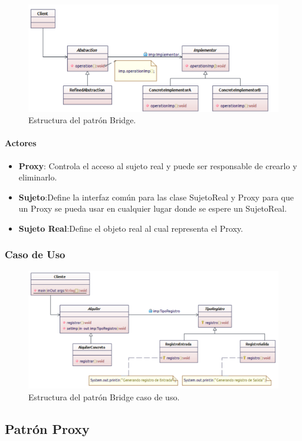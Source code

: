 \begin{figure}[th!]
	\centering
	\includegraphics[width=.7\linewidth]{imagenes/Patrones/Bridge.pdf}
	\caption{Estructura del patrón Bridge.\cite{gof}}	
\end{figure}

\paragraph{Actores}

\begin{itemize}
	\item \textbf{Proxy}: Controla el acceso al sujeto real y puede ser responsable de crearlo y eliminarlo.
	\item \textbf{Sujeto}:Define la interfaz común para las clase SujetoReal y Proxy para que un Proxy se pueda usar en cualquier lugar donde se espere un SujetoReal.
	\item \textbf{Sujeto Real}:Define el objeto real al cual representa el Proxy.
\end{itemize}


\subsubsection{Caso de Uso}
\begin{figure}[th!]
	\centering
	\includegraphics[width=.7\linewidth]{imagenes/Patrones/Bridge_caso.pdf}
	\caption{Estructura del patrón Bridge caso de uso.\cite{gof}}	
\end{figure}
\subsection{Patrón Proxy}

